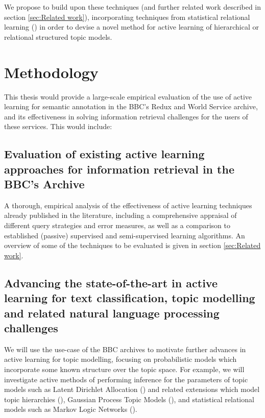 \documentclass[a4paper, 11pt]{article}
\begin{document}
We propose to build upon these techniques (and further related work described in section \ref{sec:Related work}), incorporating techniques from statistical relational learning (\cite{Getoor2007}) in order to devise a novel method for active learning of hierarchical or relational structured topic models.

\section{Methodology}
\label{sec:Methodology}
This thesis would provide a large-scale empirical evaluation of the use of active learning for semantic annotation in the BBC's Redux and World Service archive, and its effectiveness in solving information retrieval challenges for the users of these services. This would include:

\subsection{Evaluation of existing active learning approaches for information retrieval in the BBC's Archive}

A thorough, empirical analysis of the effectiveness of active learning techniques already published in the literature, including a comprehensive appraisal of different query strategies and error measures, as well as a comparison to established (passive) supervised and semi-supervised learning algorithms. An overview of some of the techniques to be evaluated is given in section \ref{sec:Related work}.

\subsection{Advancing the state-of-the-art in active learning for text classification, topic modelling and related natural language processing challenges}

We will use the use-case of the BBC archives to motivate further advances in active learning for topic modelling, focusing on probabilistic models which incorporate some known structure over the topic space. For example, we will investigate active methods of performing inference for the parameters of topic models such as Latent Dirichlet Allocation (\cite{Blei2003}) and related extensions which model topic hierarchies (\cite{Blei2003a}), Gaussian Process Topic Models (\cite{Agovic2012}), and statistical relational models such as Markov Logic Networks (\cite{Domingos2007}).
\end{document}
